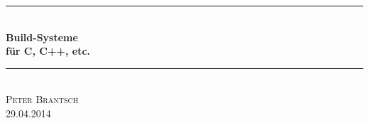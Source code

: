 \begin{titlepage}
	\center
	\rule{\textwidth}{1.5pt}\\
	\vspace{1.5em}
	{ 
		\fontsize{30pt}{36pt}\selectfont
		\textbf{Build-Systeme}
	}\\[0.5em]
	{ 
		\fontsize{20pt}{24pt}\selectfont
		\textbf{für C, C++, etc.}
	}
	\vspace{1.5em}
	\rule{\textwidth}{1.5pt}\\
	\vspace{2em}
	{
		\fontsize{16pt}{20pt}\selectfont
		\textsc{Peter Brantsch}
		~\\[1em]
		29.04.2014
	}

\end{titlepage}
